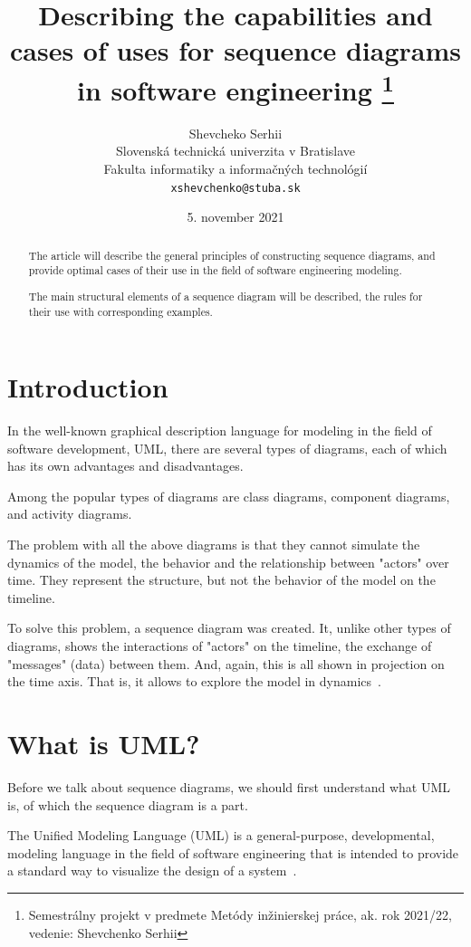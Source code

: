 \documentclass[10pt,slovak,a4paper]{article}
\title{Describing the capabilities and cases of uses for sequence diagrams in software engineering \thanks{Semestrálny projekt v predmete Metódy inžinierskej práce, ak. rok 2021/22, vedenie: Shevchenko Serhii}} %
\author{Shevcheko Serhii\\[2pt]
	{\small Slovenská technická univerzita v Bratislave}\\
	{\small Fakulta informatiky a informačných technológií}\\
	{\small \texttt{xshevchenko@stuba.sk}}
	}
\date{\small 5. november 2021}
\begin{document}
\maketitle

\begin{abstract}
The article will describe the general principles of constructing sequence diagrams, and provide optimal cases of their use in the field of software engineering modeling.

The main structural elements of a sequence diagram will be described, the rules for their use with corresponding examples.
\end{abstract}



\section{Introduction}

In the well-known graphical description language for modeling in the field of software development, UML, there are several types of diagrams, each of which has its own advantages and disadvantages.

Among the popular types of diagrams are class diagrams, component diagrams, and activity diagrams.

The problem with all the above diagrams is that they cannot simulate the dynamics of the model, the behavior and the relationship between "actors" over time. They represent the structure, but not the behavior of the model on the timeline.

To solve this problem, a sequence diagram was created. It, unlike other types of diagrams, shows the interactions of "actors" on the timeline, the exchange of "messages" (data) between them. And, again, this is all shown in projection on the time axis. That is, it allows to explore the model in dynamics~\cite{Sequence_diagram:Lambert}.

\section{What is UML?} \label{what_is_diagram}
Before we talk about sequence diagrams, we should first understand what UML is, of which the sequence diagram is a part.

The Unified Modeling Language (UML) is a general-purpose, developmental, modeling language in the field of software engineering that is intended to provide a standard way to visualize the design of a system~\cite{UML_Distilled}. 
\end{document}

